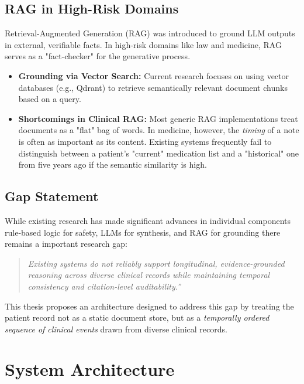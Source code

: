 \subsection{RAG in High-Risk Domains} Retrieval-Augmented Generation (RAG) was introduced to ground LLM outputs in external, verifiable facts. In high-risk domains like law and medicine, RAG serves as a "fact-checker" for the generative process. \begin{itemize} \item \textbf{Grounding via Vector Search:} Current research focuses on using vector databases (e.g., Qdrant) to retrieve semantically relevant document chunks based on a query. \item \textbf{Shortcomings in Clinical RAG:} Most generic RAG implementations treat documents as a "flat" bag of words. In medicine, however, the \textit{timing} of a note is often as important as its content. Existing systems frequently fail to distinguish between a patient's "current" medication list and a "historical" one from five years ago if the semantic similarity is high. \end{itemize}

\subsection{Gap Statement} While existing research has made significant advances in individual components rule-based logic for safety, LLMs for synthesis, and RAG for grounding there remains a important research gap: \begin{quote} \textit{Existing systems do not reliably support longitudinal, evidence-grounded reasoning across diverse clinical records while maintaining temporal consistency and citation-level auditability.''} \end{quote} This thesis proposes an architecture designed to address this gap by treating the patient record not as a static document store, but as a \textit{temporally ordered sequence of clinical events} drawn from diverse clinical records.

\section{System Architecture}
\label{sec:architecture}
